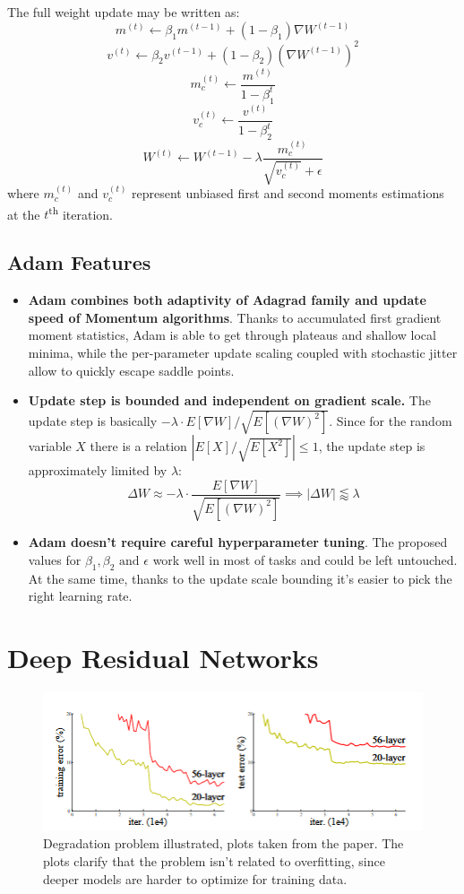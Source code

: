 \documentclass[thesis=B,english]{FITthesis}[2019/12/23]
\begin{document}
The full weight update may be written as:
\[m^{(t)} \longleftarrow \beta_1 m^{(t-1)} + (1 - \beta_1) \nabla W^{(t-1)}\]
\[v^{(t)} \longleftarrow \beta_2 v^{(t-1)} + (1 - \beta_2) (\nabla W^{(t-1)})^2\]
\[m^{(t)}_c \longleftarrow \frac{m^{(t)}}{1 - \beta_1^{t}}\]
\[v^{(t)}_c \longleftarrow \frac{v^{(t)}}{1 - \beta_2^{t}}\]
\[W^{(t)} \longleftarrow W^{(t-1)} - \lambda \frac{m^{(t)}_c}{\sqrt{v^{(t)}_c} + \epsilon}\]
where $m^{(t)}_c$ and $v^{(t)}_c$ represent unbiased first and second moments estimations at the $t$\textsuperscript{th} iteration.

\subsection{Adam Features}

\begin{itemize}
	
	\item \textbf{Adam combines both adaptivity of Adagrad family and update speed of Momentum algorithms}. Thanks to accumulated first gradient moment statistics, Adam is able to get through plateaus and shallow local minima, while the per-parameter update scaling coupled with stochastic jitter allow to quickly escape saddle points.
	\item \textbf{Update step is bounded and independent on gradient scale.} The update step is basically $- \lambda \cdot E[ \nabla W] / \sqrt{ E[(\nabla W)^2] }$. Since for the random variable $X$ there is a relation $| E[X] / \sqrt{ E[X^2]} | \leq 1 $, the update step is approximately limited by $\lambda$:
	\[\Delta W \approx - \lambda \cdot \frac{E[ \nabla W]}{\sqrt{ E[(\nabla W)^2] }} \implies |\Delta W| \lessapprox \lambda \]
	\item \textbf{Adam doesn't require careful hyperparameter tuning}. The proposed values for $\beta_1, \beta_2 \text{ and } \epsilon$ work well in most of tasks and could be left untouched. At the same time, thanks to the update scale bounding it's easier to pick the right learning rate.
\end{itemize}

\section{Deep Residual Networks}

\begin{figure}[h]
	\centering
	\includegraphics{images/degradation.png}
	\caption{Degradation problem illustrated, plots taken from the paper\cite{resnet}. The plots clarify that the problem isn't related to overfitting, since deeper models are harder to optimize for training data.}
\end{figure}
\end{document}
